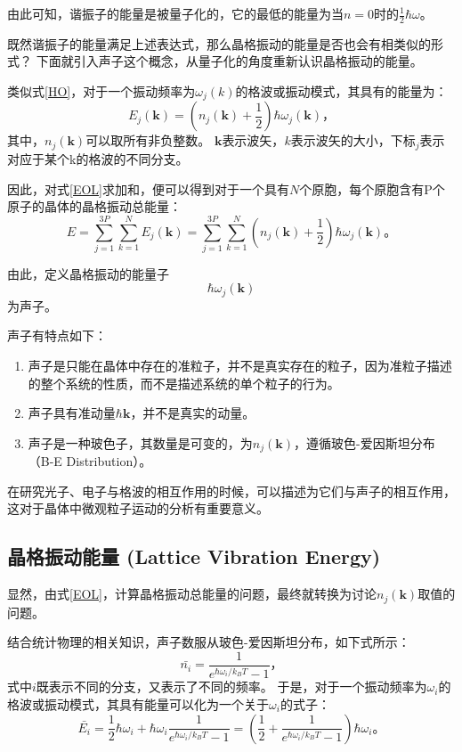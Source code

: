 \documentclass[declarePage]{ecnuthesis}
\begin{document}
由此可知，谐振子的能量是被量子化的，它的最低的能量为当$n=0$时的$\frac{1}{2} \hbar \omega$。

既然谐振子的能量满足上述表达式，那么晶格振动的能量是否也会有相类似的形式？%
下面就引入声子这个概念，从量子化的角度重新认识晶格振动的能量。

类似式\ref{HO}，对于一个振动频率为$\omega_j(k)$的格波或振动模式，其具有的能量为：
\begin{equation}
    E_j(\mathbf{k}) = (n_j(\mathbf{k}) + \frac{1}{2})\hbar \omega_j(\mathbf{k}) \text{，} \label{EOL}
\end{equation}
其中，$n_j(\mathbf{k})$可以取所有非负整数。%
$\mathbf{k}$表示波矢，$k$表示波矢的大小，下标$_j$表示对应于某个k的格波的不同分支。

因此，对式\ref{EOL}求加和，便可以得到对于一个具有$N$个原胞，每个原胞含有P个原子的晶体的晶格振动总能量：
\begin{equation}
    E = \sum_{j=1}^{3P}\sum_{k=1}^{N}E_j(\mathbf{k}) = \sum_{j=1}^{3P}\sum_{k=1}^{N}(n_j(\mathbf{k}) + \frac{1}{2})\hbar \omega_j(\mathbf{k}) \text{。} \label{EOC}
\end{equation}

由此，定义晶格振动的能量子
\begin{equation}
    \hbar \omega_j(\mathbf{k})
\end{equation}
为声子。

声子有特点如下：
\begin{enumerate}
    \item 声子是只能在晶体中存在的准粒子，并不是真实存在的粒子，因为准粒子描述的整个系统的性质，而不是描述系统的单个粒子的行为。
    \item 声子具有准动量$\hbar \mathbf{k}$，并不是真实的动量。
    \item 声子是一种玻色子，其数量是可变的，为$n_j(\mathbf{k})$，遵循玻色-爱因斯坦分布（B-E Distribution）。
\end{enumerate}

在研究光子、电子与格波的相互作用的时候，可以描述为它们与声子的相互作用，这对于晶体中微观粒子运动的分析有重要意义。

\subsection{晶格振动能量 (Lattice Vibration Energy)}

显然，由式\ref{EOL}，计算晶格振动总能量的问题，最终就转换为讨论$n_j(\mathbf{k})$取值的问题。

结合统计物理的相关知识，声子数服从玻色-爱因斯坦分布，如下式所示：
\begin{equation}
    \bar{n_i} = \frac{1}{e^{\hbar \omega_i / k_B T}-1} \text{，}
\end{equation}
式中$i$既表示不同的分支，又表示了不同的频率。%
于是，对于一个振动频率为$\omega_i$的格波或振动模式，其具有能量可以化为一个关于$\omega_i$的式子：
\begin{equation}
    \bar{E_i} = \frac{1}{2}\hbar \omega_i + \hbar \omega_i \frac{1}{e^{\hbar \omega_i / k_B T}-1} = \left(\frac{1}{2} + \frac{1}{e^{\hbar \omega_i / k_B T}-1}\right)\hbar \omega_i \text{。} \label{EOL2}
\end{equation}
\end{document}
